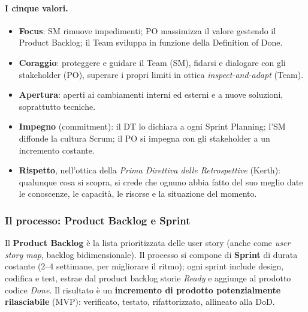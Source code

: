 \documentclass[a4paper,12pt]{article}
\begin{document}
\paragraph{I cinque valori.}
\begin{itemize}
  \item \textbf{Focus}: SM rimuove impedimenti; PO massimizza il valore gestendo il
        Product Backlog; il Team sviluppa in funzione della Definition of Done.
  \item \textbf{Coraggio}: proteggere e guidare il Team (SM), fidarsi e dialogare con gli
        stakeholder (PO), superare i propri limiti in ottica \emph{inspect-and-adapt}
        (Team).
  \item \textbf{Apertura}: aperti ai cambiamenti interni ed esterni e a nuove soluzioni,
        soprattutto tecniche.
  \item \textbf{Impegno} (commitment): il DT lo dichiara a ogni Sprint Planning; l'SM
        diffonde la cultura Scrum; il PO si impegna con gli stakeholder a un incremento
        costante.
  \item \textbf{Rispetto}, nell'ottica della \emph{Prima Direttiva delle Retrospettive}
        (Kerth): qualunque cosa si scopra, si crede che ognuno abbia fatto del suo meglio
        date le conoscenze, le capacità, le risorse e la situazione del momento.
\end{itemize}

\subsubsection{Il processo: Product Backlog e Sprint}
Il \textbf{Product Backlog} è la lista prioritizzata delle user story (anche come
\emph{user story map}, backlog bidimensionale). Il processo si compone di \textbf{Sprint}
di durata costante (2--4 settimane, per migliorare il ritmo); ogni sprint include
design, codifica e test, estrae dal product backlog storie \emph{Ready} e aggiunge al
prodotto codice \emph{Done}. Il risultato è un \textbf{incremento di prodotto
potenzialmente rilasciabile} (MVP): verificato, testato, rifattorizzato, allineato alla
DoD.
\end{document}
